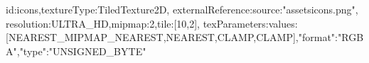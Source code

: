 {id:icons,textureType:TiledTexture2D,
externalReference:{source:"assets\/icons.png"},
resolution:ULTRA_HD,mipmap:2,tile:[10,2],
texParameters:{values:[NEAREST_MIPMAP_NEAREST,NEAREST,CLAMP,CLAMP]},"format":"RGBA","type":"UNSIGNED_BYTE"}